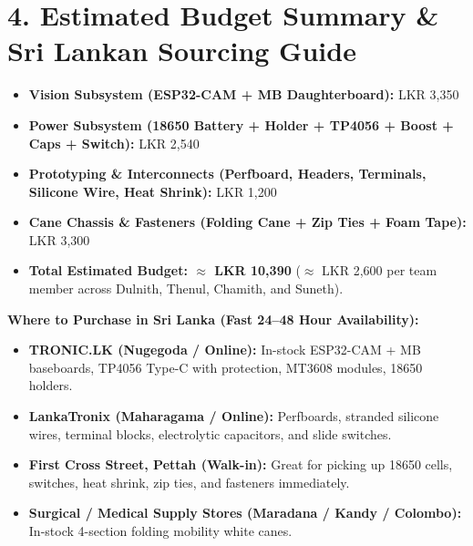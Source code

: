 \documentclass[10pt,a4paper]{article}
\begin{document}
\section{4. Estimated Budget Summary \& Sri Lankan Sourcing Guide}
\begin{itemize}
    \item \textbf{Vision Subsystem (ESP32-CAM + MB Daughterboard):} LKR 3,350
    \item \textbf{Power Subsystem (18650 Battery + Holder + TP4056 + Boost + Caps + Switch):} LKR 2,540
    \item \textbf{Prototyping \& Interconnects (Perfboard, Headers, Terminals, Silicone Wire, Heat Shrink):} LKR 1,200
    \item \textbf{Cane Chassis \& Fasteners (Folding Cane + Zip Ties + Foam Tape):} LKR 3,300
    \item \textbf{Total Estimated Budget: $\approx$ LKR 10,390} ($\approx$ LKR 2,600 per team member across Dulnith, Thenul, Chamith, and Suneth).
\end{itemize}

\vspace{0.3em}
\noindent\textbf{Where to Purchase in Sri Lanka (Fast 24--48 Hour Availability):}
\begin{itemize}
    \item \textbf{TRONIC.LK (Nugegoda / Online):} In-stock ESP32-CAM + MB baseboards, TP4056 Type-C with protection, MT3608 modules, 18650 holders.
    \item \textbf{LankaTronix (Maharagama / Online):} Perfboards, stranded silicone wires, terminal blocks, electrolytic capacitors, and slide switches.
    \item \textbf{First Cross Street, Pettah (Walk-in):} Great for picking up 18650 cells, switches, heat shrink, zip ties, and fasteners immediately.
    \item \textbf{Surgical / Medical Supply Stores (Maradana / Kandy / Colombo):} In-stock 4-section folding mobility white canes.
\end{itemize}
\end{document}
